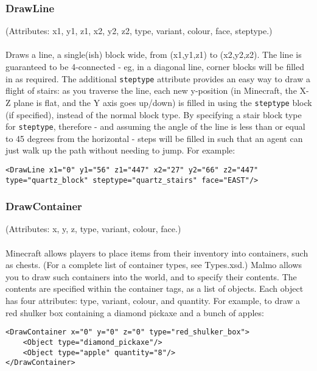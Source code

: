 \documentclass[11pt]{article} %
\begin{document}
\subsubsection{DrawLine}
(Attributes: x1, y1, z1, x2, y2, z2, type, variant, colour, face, steptype.)\\
\\
Draws a line, a single(ish) block wide, from (x1,y1,z1) to (x2,y2,z2). The line is guaranteed to be 4-connected - eg, in a diagonal line, corner blocks will be filled in as required. The additional \lstinline!steptype! attribute provides an easy way to draw a flight of stairs: as you traverse the line, each new y-position (in Minecraft, the X-Z plane is flat, and the Y axis goes up/down) is filled in using the \lstinline!steptype! block (if specified), instead of the normal block type. By specifying a stair block type for \lstinline!steptype!, therefore - and assuming the angle of the line is less than or equal to 45 degrees from the horizontal - steps will be filled in such that an agent can just walk up the path without needing to jump. For example:
\\
\begin{lstlisting}[frame=lines]
<DrawLine x1="0" y1="56" z1="447" x2="27" y2="66" z2="447" type="quartz_block" steptype="quartz_stairs" face="EAST"/>
\end{lstlisting}
                    
\subsubsection{DrawContainer}
(Attributes: x, y, z, type, variant, colour, face.)\\
\\
Minecraft allows players to place items from their inventory into containers, such as chests. (For a complete list of container types, see Types.xsd.) Malmo allows you to draw such containers into the world, and to specify their contents. The contents are specified within the container tags, as a list of objects. Each object has four attributes: type, variant, colour, and quantity.
For example, to draw a red shulker box containing a diamond pickaxe and a bunch of apples:
\\
\begin{lstlisting}[frame=lines]
<DrawContainer x="0" y="0" z="0" type="red_shulker_box">
    <Object type="diamond_pickaxe"/>
    <Object type="apple" quantity="8"/>
</DrawContainer>
\end{lstlisting}
\end{document}
